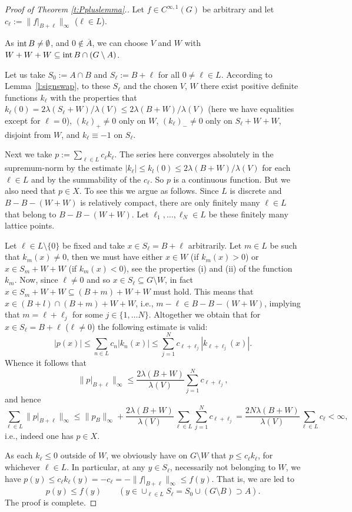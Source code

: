 \documentclass[[a4paper,english,12pt]{amsart}
\theoremstyle{plain}
\theoremstyle{remark}
\newcommand{\intt}{\mbox{\rm int\,}}
\begin{document}
\begin{proof}[Proof of Theorem  \ref{t:Ppluslemma}.]
	Let  $f\in C^{\infty,1}(G)$ be arbitrary and let $c_\ell:=\|f|_{B+\ell}\|_\infty$ ($\ell \in L$).

As $\intt B \ne \emptyset$, and $0 \not \in \overline{A}$, we can choose $V$ and $W$ with $W+W+W \subseteq  \intt B \cap (G\setminus A)$.

Let us take $S_0:= A \cap B$ and $S_\ell:= B+\ell$ for all $0 \ne \ell \in L$.
According to Lemma~\ref{l:signswap}, to these $S_\ell$ and the chosen $V$, $W$ there exist positive definite functions $k_\ell$ with the properties that $k_\ell(0) = 2\lambda(S_\ell+W)/\lambda(V) \le 2 \lambda(B+W)/\lambda(V)$ (here we have equalities except for $\ell=0$), $(k_\ell)_{+} \ne 0$ only on $W$, $(k_\ell)_{-} \ne 0$ only on $S_\ell+W+W$, disjoint from $W$, and $k_\ell \equiv -1$ on $S_\ell$.

Next we take $p:=\sum_{\ell \in L} c_\ell k_{\ell}$.
The series here converges absolutely in the supremum-norm by the estimate  $|k_\ell|\leq k_l(0)\leq  2 \lambda(B+W)/\lambda(V)$ for each $\ell\in L$ and by the summability of the $c_\ell$. So $p$ is a continuous function. But we also need that $p\in X$.  To see this we argue as follows. Since $L$ is discrete and $B-B-(W+W)$ is relatively compact, there are only finitely many $\ell\in L$ that belong to $B-B-(W+W)$. Let $\ell_1,\dots,\ell_N\in L$ be these finitely many lattice points.

Let $\ell\in L\setminus\{0\}$ be fixed and take $x\in S_{\ell}=B+\ell$ arbitrarily. Let $m\in L$ be such that $k_{m}(x)\neq 0$, then we must have either $x\in W$ (if $k_{m}(x)>0$) or $x\in S_m+W+W$  (if $k_{m}(x)<0$), see the properties (i) and (ii) of the function $k_{m}$. Now, since $\ell\neq 0$ and so $x\in S_{\ell}\subseteq G\setminus W$,  in fact $x\in S_m+W+W\subseteq (B+m)+W+W$ must hold. This means that $x\in (B+l)\cap (B+m)+W+W$, i.e., $m-\ell\in B-B-(W+W)$, implying that $m=\ell+\ell_j$ for some $j\in \{1,\dots N\}$. Altogether we obtain that for $x\in S_\ell=B+\ell$ ($\ell\neq 0$) the following estimate is valid:
\[
|p(x)|\leq \sum_{n\in L} c_n|k_{n}(x)|\leq \sum_{j=1}^N c_{\ell+\ell_j}|k_{\ell+\ell_j}(x)|.
\]
Whence it follows that
\[
\|p|_{B+\ell}\|_\infty\leq  \frac{2 \lambda(B+W)}{\lambda(V)}\sum_{j=1}^N c_{\ell+\ell_j},
\]
and hence
\[
\sum_{\ell\in L}\|p|_{B+\ell}\|_\infty\leq \|p_{B}\|_\infty+\frac{2 \lambda(B+W)}{\lambda(V)}\sum_{\ell\in L}\sum_{j=1}^N c_{\ell+\ell_j}=  \frac{2N \lambda(B+W)}{\lambda(V)}\sum_{\ell\in L}c_\ell<\infty,
\]
i.e., indeed one has $p\in X$.


\medskip\noindent  As each $k_\ell \le 0$ outside of $W$, we obviously have on $G\setminus W$ that $p \le c_\ell k_\ell$, for whichever $\ell \in L$. In particular, at any $y \in S_\ell$, necessarily not belonging to $W$, we have $p(y)\le c_\ell k_\ell(y) = - c_\ell = -\|f|_{B+\ell}\|_\infty \le f(y)$. That is, we are led to
\[
p(y) \le f(y) \qquad (y \in \cup_{\ell \in L} S_\ell =S_0 \cup(G\setminus B) \supset A).
\]
The proof is complete.
\end{proof}
\end{document}
